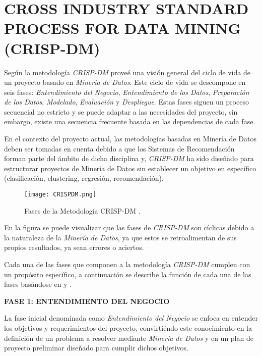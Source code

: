 \section{CROSS INDUSTRY STANDARD PROCESS FOR DATA MINING (CRISP-DM)}

Según \parencite{wirth2000crisp} la metodología \textit{CRISP-DM} proveé una visión general del ciclo de vida de un proyecto basado en \textit{Minería de Datos}. Este ciclo de vida se descompone en seis fases: \textit{Entendimiento del Negocio}, \textit{Entendimiento de los Datos}, \textit{Preparación de los Datos}, \textit{Modelado}, \textit{Evaluación} y \textit{Despliegue}. Estas fases siguen un proceso secuencial no estricto y se puede adaptar a las necesidades del proyecto, sin embargo, existe una secuencia frecuente basada en las dependencias de cada fase.

En el contexto del proyecto actual, las metodologías basadas en Minería de Datos deben ser tomadas en cuenta debido a que los Sistemas de Recomendación forman parte del ámbito de dicha disciplina y, \textit{CRISP-DM} ha sido diseñado para estructurar proyectos de Minería de Datos sin establecer un objetivo en específico (clasificación, clustering, regresión, recomendación).

\begin{figure}[h!]
    \centering
    \texttt{[image: CRISPDM.png]}
    \caption{Fases de la Metodología CRISP-DM \parencite{wirth2000crisp}.}
    \label{fig:FasesCRISPDM}
\end{figure}

En la figura  se puede visualizar que las fases de \textit{CRISP-DM} son cíclicas debido a la naturaleza de la \textit{Minería de Datos}, ya que estos se retroalimentan de sus propios resultados, ya sean errores o aciertos.

Cada una de las fases que componen a la metodología \textit{CRISP-DM} cumplen con un propósito específico, a continuación se describe la función de cada una de las fases basándose en \parencite{schroer2021systematic} y \parencite{wirth2000crisp}.

\textbf{FASE 1: ENTENDIMIENTO DEL NEGOCIO}

La fase inicial denominada como \textit{Entendimiento del Negocio} se enfoca en entender los objetivos y requerimientos del proyecto, convirtiéndo este conocimiento en la definición de un problema a resolver mediante \textit{Minería de Datos} y en un plan de proyecto preliminar diseñado para cumplir dichos objetivos.

